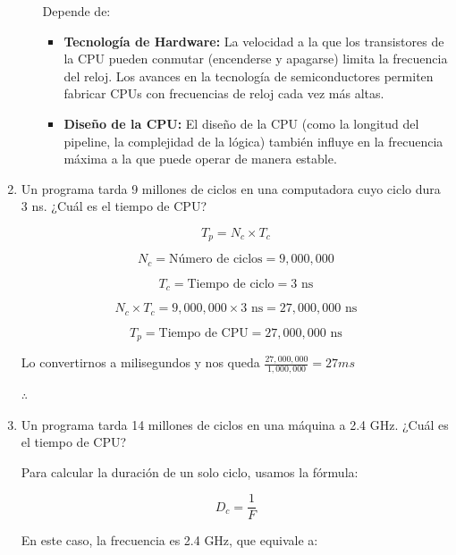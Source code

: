 \documentclass[12pt,letterpaper]{article}
\begin{document}
\begin{enumerate}
\begin{enumerate}[label=\arabic*)]
    Depende de:\\
    \begin{itemize}
    \item \textbf{Tecnología de Hardware:} La velocidad a la que los transistores de la CPU pueden conmutar (encenderse y apagarse) limita la frecuencia del reloj. Los avances en la tecnología de semiconductores permiten fabricar CPUs con frecuencias de reloj cada vez más altas.
      
    \item \textbf{Diseño de la CPU:} El diseño de la CPU (como la longitud del pipeline, la complejidad de la lógica) también influye en la frecuencia máxima a la que puede operar de manera estable.
      \bigskip
    \end{itemize}
  \end{enumerate}
  
\item Un programa tarda 9 millones de ciclos en una computadora cuyo ciclo dura 3 ns. ¿Cuál es el tiempo de CPU?
  \bigskip

  \[
  T_p = N_c \times T_c
  \]
  
  \[
  N_c = \text{Número de ciclos} = 9,000,000
  \]
  
  \[
  T_c = \text{Tiempo de ciclo} = 3 \text{ ns}
  \]
  
  \[
  N_c \times T_c = 9,000,000 \times 3 \text{ ns} = 27,000,000 \text{ ns}
  \]
  
  \[
  T_p = \text{Tiempo de CPU} = 27,000,000 \text{ ns}
  \]
  
  Lo convertirnos a milisegundos y nos queda $\frac{27,000,000}{1,000,000} = 27 ms$
  
  \begin{center}
    \(\therefore\) \\
  \end{center}
  \bigskip
  
\item Un programa tarda 14 millones de ciclos en una máquina a 2.4 GHz. ¿Cuál es el tiempo de CPU?
  \bigskip

  Para calcular la duración de un solo ciclo, usamos la fórmula:

  \[
  D_c = \frac{1}{F}
  \]
  
  En este caso, la frecuencia es 2.4 GHz, que equivale a:
  

\end{enumerate}
\end{document}
